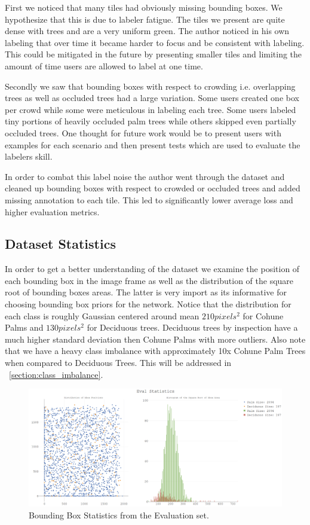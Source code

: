 First we noticed that many tiles had obviously missing bounding boxes. We hypothesize that this is due to labeler fatigue. The tiles we present are quite dense with trees and are a very uniform green. The author noticed in his own labeling that over time it became harder to focus and be consistent with labeling. This could be mitigated in the future by presenting smaller tiles and limiting the amount of time users are allowed to label at one time.

Secondly we saw that bounding boxes with respect to crowding i.e. overlapping trees as well as occluded trees had a large variation. Some users created one box per crowd while some were meticulous in labeling each tree. Some users labeled tiny portions of heavily occluded palm trees while others skipped even partially occluded trees. One thought for future work would be to present users with examples for each scenario and then present tests which are used to evaluate the labelers skill.

In order to combat this label noise the author went through the dataset and cleaned up bounding boxes with respect to crowded or occluded trees and added missing annotation to each tile. This led to significantly lower average loss and higher evaluation metrics.

\subsection{Dataset Statistics} \label{section:statistics}

In order to get a better understanding of the dataset we examine the position of each bounding box in the image frame as well as the distribution of the square root of bounding boxes areas. The latter is very import as its informative for choosing bounding box priors for the network. Notice that the distribution for each class is roughly Gaussian centered around mean $210 pixels^2$ for Cohune Palms and $130 pixels^2$ for Deciduous trees. Deciduous trees by inspection have a much higher standard deviation then Cohune Palms with more outliers. Also note that we have a heavy class imbalance with approximately 10x Cohune Palm Trees when compared to Deciduous Trees. This will be addressed in ~\ref{section:class_imbalance}.

\begin{figure}[ht]
\includegraphics[width=1.0\textwidth]{Figures/EvalStats.png}
\caption{Bounding Box Statistics from the Evaluation set.}
\label{fig:EvalStats}
\end{figure}

